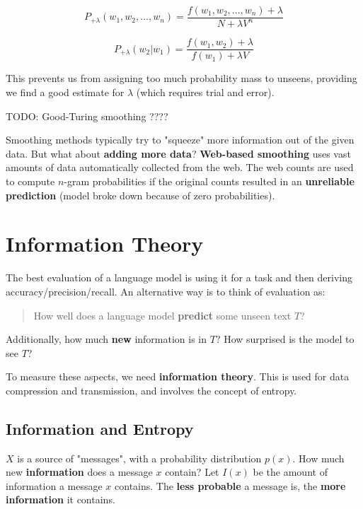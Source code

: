 \documentclass{article}
\begin{document}
\begin{equation}
	P_{+\lambda}(w_1,w_2,...,w_n) = \frac{f(w_1,w_2,...,w_n) + \lambda}{N + \lambda V^{n}}
	\label{eq:lidstone-n-sequence}
\end{equation}

\begin{equation}
	P_{+\lambda}(w_2|w_1) = \frac{f(w_1,w_2) + \lambda}{f(w_1) + \lambda V}
	\label{eq:lidstone-bigram}
\end{equation}

This prevents us from assigning too much probability mass to unseens, providing we find a good estimate for $\lambda$ (which requires trial and error).

TODO: Good-Turing smoothing
????

Smoothing methods typically try to "squeeze" more information out of the given data. But what about  \textbf{adding more data}? \textbf{Web-based smoothing} uses vast amounts of data automatically collected from the web. The web counts are used to compute $n$-gram probabilities if the original counts resulted in an \textbf{unreliable prediction} (model broke down because of zero probabilities).

\section{Information Theory}

The best evaluation of a language model is using it for a task and then deriving accuracy/precision/recall. An alternative way is to think of evaluation as:
\begin{quote}
	How well does a language model \textbf{predict} some unseen text $T$?
\end{quote}
Additionally, how much \textbf{new} information is in $T$? How surprised is the model to see $T$?

To measure these aspects, we need \textbf{information theory}. This is used for data compression and transmission, and involves the concept of entropy.

\subsection{Information and Entropy}

$X$ is a source of "messages", with a probability distribution $p(x)$. How much new \textbf{information} does a message $x$ contain? Let $I(x)$ be the amount of information a message $x$ contains. The \textbf{less probable} a message is, the \textbf{more information} it contains.
\end{document}
